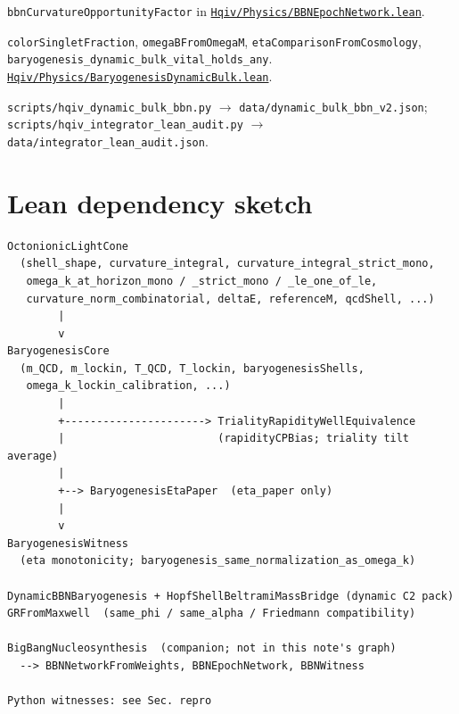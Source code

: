 \documentclass[11pt]{amsart}
\newcommand{\leanrepo}{https://github.com/HQIV/hqiv-lean/blob/main}
\newcommand{\leanfile}[1]{\href{\leanrepo/#1}{\nolinkurl{#1}}}
\newcommand{\leanid}[1]{\nolinkurl{#1}}
\begin{document}
\begin{description}[leftmargin=0em,style=nextline]
  \leanid{bbnCurvatureOpportunityFactor} in
  \leanfile{Hqiv/Physics/BBNEpochNetwork.lean}.
\item[\phantomsection\label{lean:dynamic-bulk-vital}\textbf{Dynamic bulk vital bundle.}]
  \leanid{colorSingletFraction}, \leanid{omegaBFromOmegaM},
  \leanid{etaComparisonFromCosmology},
  \leanid{baryogenesis\_dynamic\_bulk\_vital\_holds\_any}.
  \leanfile{Hqiv/Physics/BaryogenesisDynamicBulk.lean}.
\item[\phantomsection\label{lean:dynamic-bulk-witness}\textbf{Dynamic bulk witness (Python).}]
  \texttt{scripts/hqiv\_dynamic\_bulk\_bbn.py} $\to$
  \texttt{data/dynamic\_bulk\_bbn\_v2.json};
  \texttt{scripts/hqiv\_integrator\_lean\_audit.py} $\to$
  \texttt{data/integrator\_lean\_audit.json}.
\end{description}
\endgroup

\section{Lean dependency sketch}
\label{app:dependency}

{\footnotesize
\begin{verbatim}
OctonionicLightCone
  (shell_shape, curvature_integral, curvature_integral_strict_mono,
   omega_k_at_horizon_mono / _strict_mono / _le_one_of_le,
   curvature_norm_combinatorial, deltaE, referenceM, qcdShell, ...)
        |
        v
BaryogenesisCore
  (m_QCD, m_lockin, T_QCD, T_lockin, baryogenesisShells,
   omega_k_lockin_calibration, ...)
        |
        +----------------------> TrialityRapidityWellEquivalence
        |                        (rapidityCPBias; triality tilt average)
        |
        +--> BaryogenesisEtaPaper  (eta_paper only)
        |
        v
BaryogenesisWitness
  (eta monotonicity; baryogenesis_same_normalization_as_omega_k)

DynamicBBNBaryogenesis + HopfShellBeltramiMassBridge (dynamic C2 pack)
GRFromMaxwell  (same_phi / same_alpha / Friedmann compatibility)

BigBangNucleosynthesis  (companion; not in this note's graph)
  --> BBNNetworkFromWeights, BBNEpochNetwork, BBNWitness

Python witnesses: see Sec. repro
\end{verbatim}
}



\end{document}
